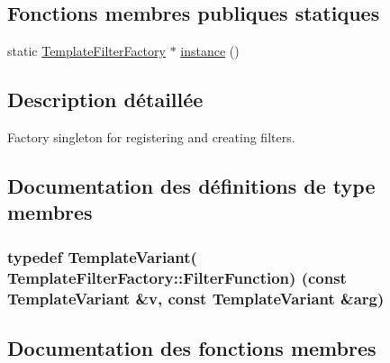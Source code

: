 \subsection*{Fonctions membres publiques statiques}
\begin{DoxyCompactItemize}
\item 
static \hyperlink{class_template_filter_factory}{Template\+Filter\+Factory} $\ast$ \hyperlink{class_template_filter_factory_a553dc85390cf5bffc2dff949fb2e6963}{instance} ()
\end{DoxyCompactItemize}


\subsection{Description détaillée}
Factory singleton for registering and creating filters. 

\subsection{Documentation des définitions de type membres}
\hypertarget{class_template_filter_factory_a22cc28c6d4d6a45817e237b4d5174c34}{}
\subsubsection[{Filter\+Function}]{\setlength{\rightskip}{0pt plus 5cm}typedef {\bf Template\+Variant}( Template\+Filter\+Factory\+::\+Filter\+Function) (const {\bf Template\+Variant} \&v, const {\bf Template\+Variant} \&arg)}\label{class_template_filter_factory_a22cc28c6d4d6a45817e237b4d5174c34}


\subsection{Documentation des fonctions membres}
\hypertarget{class_template_filter_factory_a7d6386ee3984212371e66efaa44f6ffa}{}
